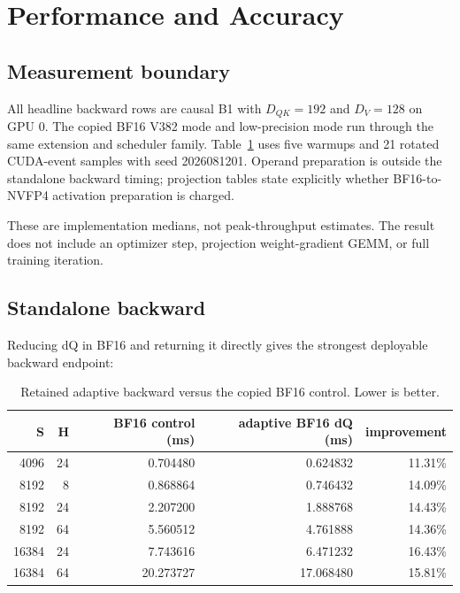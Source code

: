 \section{Performance and Accuracy}

\subsection{Measurement boundary}

All headline backward rows are causal B1 with $D_{QK}=192$ and $D_V=128$ on
GPU 0.  The copied BF16 V382 mode and low-precision mode run through the same
extension and scheduler family.  Table~\ref{tab:direct-bf16-results} uses five
warmups and 21 rotated CUDA-event samples with seed 2026081201.  Operand
preparation is outside the standalone backward timing; projection tables state
explicitly whether BF16-to-NVFP4 activation preparation is charged.

These are implementation medians, not peak-throughput estimates.  The result
does not include an optimizer step, projection weight-gradient GEMM, or full
training iteration.

\subsection{Standalone backward}

Reducing dQ in BF16 and returning it directly gives the strongest deployable
backward endpoint:

\begin{table}[htbp]
\centering
\caption{Retained adaptive backward versus the copied BF16 control.  Lower is
better.}
\label{tab:direct-bf16-results}
\small
\begin{tabular}{rrr r r}
\toprule
S & H & BF16 control (ms) & adaptive BF16 dQ (ms) & improvement \\
\midrule
4096  & 24 & 0.704480 & 0.624832 & 11.31\% \\
8192  & 8  & 0.868864 & 0.746432 & 14.09\% \\
8192  & 24 & 2.207200 & 1.888768 & 14.43\% \\
8192  & 64 & 5.560512 & 4.761888 & 14.36\% \\
16384 & 24 & 7.743616 & 6.471232 & 16.43\% \\
16384 & 64 & 20.273727 & 17.068480 & 15.81\% \\
\bottomrule
\end{tabular}
\end{table}

